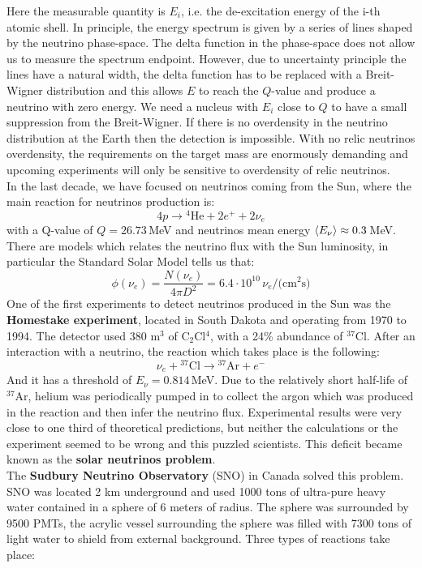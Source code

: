 \documentclass[10.75pt,a4paper,openright,bottom=2cm]{article}
\begin{document}
Here the measurable quantity is $E_i$, i.e. the de-excitation energy of the i-th atomic shell. In principle, the energy spectrum is given by a series of lines shaped by the neutrino phase-space. The delta function in the phase-space does not allow us to measure the spectrum endpoint. However, due to uncertainty principle the lines have a natural width, the delta function has to be replaced with a Breit-Wigner distribution and this allows $E$ to reach the $Q$-value and produce a neutrino with zero energy. We need a nucleus with $E_i$ close to $Q$ to have a small suppression from the Breit-Wigner. If there is no overdensity in the neutrino distribution at the Earth then the detection is impossible. With no relic neutrinos overdensity, the requirements on the target mass are enormously demanding and upcoming experiments will only be sensitive to overdensity of relic neutrinos.\\
In the last decade, we have focused on neutrinos coming from the Sun, where the main reaction for neutrinos production is:
\[
4p\to\text{$^4$He}+2e^++2\nu_e
\]
with a Q-value of $Q=26.73$\,MeV and neutrinos mean energy $\Braket{E_\nu}\approx0.3$\,MeV. There are models which relates the neutrino flux with the Sun luminosity, in particular the Standard Solar Model tells us that:
\[
\phi(\nu_e)=\frac{N(\nu_e)}{4\pi D^2}=6.4\cdot10^{10}\,\nu_e/\text{(cm$^2$s)}
\]
One of the first experiments to detect neutrinos produced in the Sun was the \textbf{Homestake experiment}, located in South Dakota and operating from 1970 to 1994. The detector used 380 m$^3$ of C$_2$Cl$^4$, with a 24\% abundance of $^{37}$Cl. After an interaction with a neutrino, the reaction which takes place is the following:
\[
\nu_e+\text{$^{37}$Cl}\to\text{$^{37}$Ar}+e^-
\]
And it has a threshold of $E_\nu=0.814$\,MeV. Due to the relatively short half-life of $^{37}$Ar, helium was periodically pumped in to collect the argon which was produced in the reaction and then infer the neutrino flux. Experimental results were very close to one third of theoretical predictions, but neither the calculations or the experiment seemed to be wrong and this puzzled scientists. This deficit became known as the \textbf{solar neutrinos problem}.\\
The \textbf{Sudbury Neutrino Observatory} (SNO) in Canada solved this problem. SNO was located 2 km underground and used 1000 tons of ultra-pure heavy water contained in a sphere of 6 meters of radius. The sphere was surrounded by 9500 PMTs, the acrylic vessel surrounding the sphere was filled with 7300 tons of light water to shield from external background. Three types of reactions take place:
\end{document}
